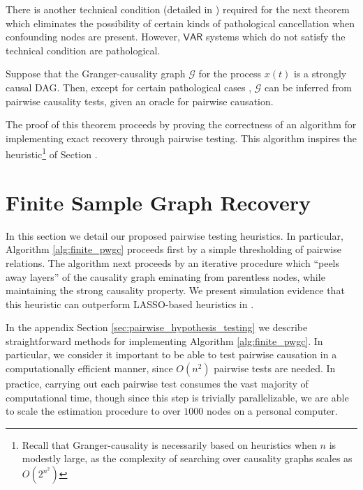 \documentclass[12pt]{article}
\def\gcg{\mathcal{G}}  %
\def\VAR{\mathsf{VAR}}  %
\begin{document}
  There is another technical condition (detailed in
  \cite{my_GC_paper}) required for the next theorem which eliminates
  the possibility of certain kinds of pathological cancellation when
  confounding nodes are present.  However, $\VAR$ systems which do not
  satisfy the technical condition are pathological.

  \begin{theorem}
    \label{thm:scg_recovery}
    Suppose that the Granger-causality graph $\gcg$ for the process
    $x(t)$ is a strongly causal DAG.  Then, except for certain
    pathological cases \cite{my_GC_paper}, $\gcg$ can be inferred from
    pairwise causality tests, given an oracle for pairwise causation.
  \end{theorem}

  The proof of this theorem proceeds by proving the correctness of an
  algorithm for implementing exact recovery through pairwise testing.
  This algorithm inspires the heuristic\footnote{Recall that
    Granger-causality is necessarily based on heuristics when $n$ is
    modestly large, as the complexity of searching over causality
    graphs scales as $O(2^{n^2})$} of Section
  \cite{sec:structure_learning}.

\section{Finite Sample Graph Recovery}
\label{sec:structure_learning}
In this section we detail our proposed pairwise testing heuristics.
In particular, Algorithm \ref{alg:finite_pwgc} proceeds first by a
simple thresholding of pairwise relations.  The algorithm next
proceeds by an iterative procedure which ``peels away layers'' of the
causality graph eminating from parentless nodes, while maintaining the
strong causality property.  We present simulation evidence that this
heuristic can outperform LASSO-based heuristics in \cite{my_GC_paper}.

In the appendix Section \ref{sec:pairwise_hypothesis_testing} we describe
straightforward methods for implementing Algorithm
\ref{alg:finite_pwgc}.  In particular, we consider it important to be
able to test pairwise causation in a computationally efficient manner,
since $O(n^2)$ pairwise tests are needed.  In practice, carrying out
each pairwise test consumes the vast majority of computational time,
though since this step is trivially parallelizable, we are able to
scale the estimation procedure to over $1000$ nodes on a personal
computer.
\end{document}
